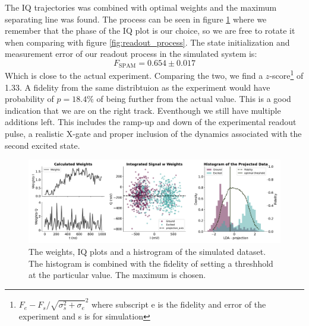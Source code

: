 The IQ trajectories was combined with optimal weights and the maximum separating line was found. The process can be seen in figure \ref{fig:simulation_readout} where we remember that the phase of the IQ plot is our choice, so we are free to rotate it when comparing with figure \ref{fig:readout_process}. The state initialization and measurement error of our readout process in the simulated system is:
\begin{equation}
    F_{\text{SPAM}} = 0.654 \pm 0.017
\end{equation}
Which is close to the actual experiment. Comparing the two, we find a $z$-score\footnote{$F_e - F_s / \sqrt{\sigma_s^2 + \sigma_e}^2$ where subscript e is the fidelity and error of the experiment and s is for simulation} of 1.33. A fidelity from the same distribtuion as the experiment would have probability of  $p = 18.4 \%$ of being further from the actual value. This is a good indication that we are on the right track. Eventhough we still have multiple additions left. This includes the ramp-up and down of the experimental readout pulse, a realistic X-gate and proper inclusion of the dynamics associated with the second excited state. 
\begin{figure}[t]
    \centering
    \includegraphics[]{Simulations/readout_simulations/figures/weigted_simulation.pdf}
    \caption{The weights, IQ plots and a histrogram of the simulated dataset. The histogram is combined with the fidelity of setting a threshhold at the particular value. The maximum is chosen.}
    \label{fig:simulation_readout}
\end{figure}